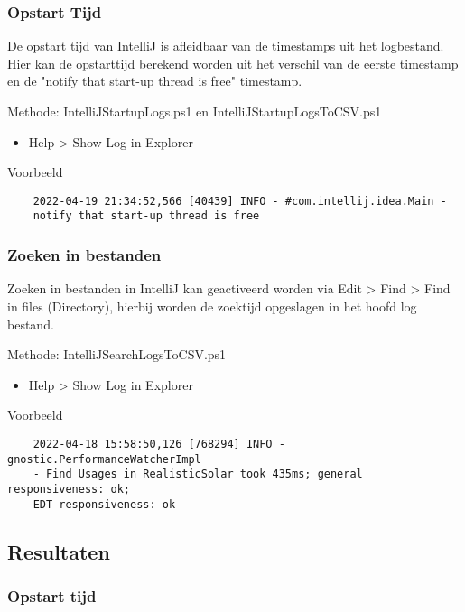\subsubsection{Opstart Tijd}
De opstart tijd van IntelliJ is afleidbaar van de timestamps uit het logbestand. Hier kan de opstarttijd berekend worden uit het verschil van de eerste timestamp en de "notify that start-up thread is free" timestamp.

Methode: IntelliJStartupLogs.ps1 en IntelliJStartupLogsToCSV.ps1
\begin{itemize}
	\item Help > Show Log in Explorer
\end{itemize}

Voorbeeld
\vspace{\verbatimOffset}
\begin{verbatim}
    2022-04-19 21:34:52,566 [40439] INFO - #com.intellij.idea.Main - 
    notify that start-up thread is free    
\end{verbatim}

\subsubsection{Zoeken in bestanden}
Zoeken in bestanden in IntelliJ kan geactiveerd worden via Edit > Find > Find in files (Directory), hierbij worden de zoektijd opgeslagen in het hoofd log bestand.

Methode: IntelliJSearchLogsToCSV.ps1
\begin{itemize}
	\item Help > Show Log in Explorer
\end{itemize}

Voorbeeld
\vspace{\verbatimOffset}
\begin{verbatim}
    2022-04-18 15:58:50,126 [768294] INFO - gnostic.PerformanceWatcherImpl
    - Find Usages in RealisticSolar took 435ms; general responsiveness: ok;
    EDT responsiveness: ok    
\end{verbatim}

\newpage

\subsection{Resultaten}
\subsubsection{Opstart tijd}

